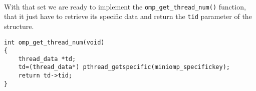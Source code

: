\par ~\\
With that set we are ready to implement the \texttt{omp\_get\_thread\_num()} function, that it just have to retrieve its specific data and return the \texttt{tid} parameter of the structure.

\begin{lstlisting}[caption=\texttt{omp\_get\_thread\_num()} function implementation, label=ompgetthreadnum]
int omp_get_thread_num(void)
{
    thread_data *td;
    td=(thread_data*) pthread_getspecific(miniomp_specifickey);
    return td->tid; 
}
\end{lstlisting}